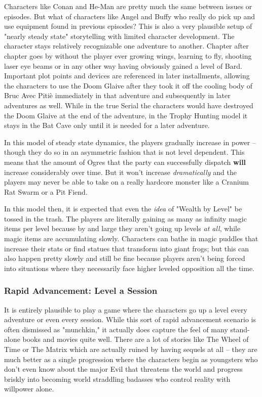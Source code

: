 Characters like Conan and He-Man are pretty much the same between issues or episodes. But what of characters like Angel and Buffy who really do pick up and use equipment found in previous episodes? This is also a very plausible setup of "nearly steady state" storytelling with limited character development. The character stays relatively recognizable one adventure to another. Chapter after chapter goes by without the player ever growing wings, learning to fly, shooting laser eye beams or in any other way having obviously gained a level of Bard. Important plot points and devices are referenced in later installments, allowing the characters to use the Doom Glaive after they took it off the cooling body of Bruc Avec Piti\`{e} immediately in that adventure and subsequently in later adventures as well. While in the true Serial the characters would have destroyed the Doom Glaive at the end of the adventure, in the Trophy Hunting model it stays in the Bat Cave only until it is needed for a later adventure.

In this model of steady state dynamics, the players gradually increase in power -- though they do so in an asymmetric fashion that is not level dependent. This means that the amount of Ogres that the party can successfully dispatch \textbf{will} increase considerably over time. But it won't increase \textit{dramatically} and the players may never be able to take on a really hardcore monster like a Cranium Rat Swarm or a Pit Fiend.

In this model then, it is expected that even the \textit{idea} of "Wealth by Level" be tossed in the trash. The players are literally gaining as many as infinity magic items per level because by and large they aren't going up levels \textit{at all}, while magic items are accumulating slowly. Characters can bathe in magic puddles that increase their stats or find statues that transform into giant frogs; but this can also happen pretty slowly and still be fine because players aren't being forced into situations where they necessarily face higher leveled opposition all the time.

\subsubsection{Rapid Advancement: Level a Session}
\vspace*{-8pt}

It is entirely plausible to play a game where the characters go up a level every adventure or even every session. While this sort of rapid advancement scenario is often dismissed as "munchkin," it actually does capture the feel of many stand-alone books and movies quite well. There are a lot of stories like The Wheel of Time or The Matrix which are actually ruined by having sequels at all -- they are much better as a single progression where the characters begin as youngsters who don't even know about the major Evil that threatens the world and progress briskly into becoming world straddling badasses who control reality with willpower alone.

